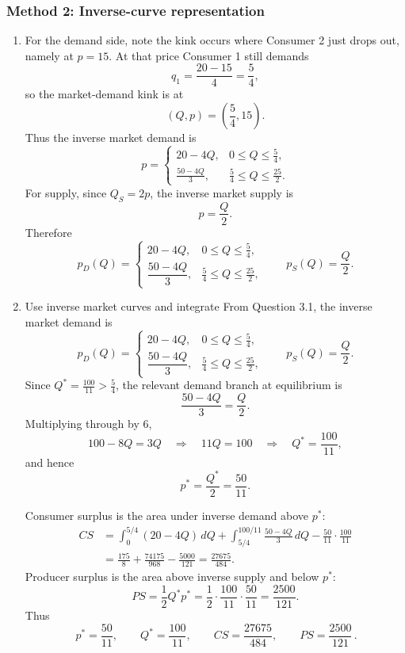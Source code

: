 \documentclass[12pt]{article}
\begin{document}
\subsubsection{Method 2: Inverse-curve representation}
\begin{enumerate}[label=(\alph*)]
    \item For the demand side, note the kink occurs where Consumer 2 just drops out, namely at \(p=15\). At that price Consumer 1 still demands
\[
q_1=\frac{20-15}{4}=\frac{5}{4},
\]
so the market-demand kink is at
\[
\left(Q,p\right)=\left(\frac{5}{4},15\right).
\]
Thus the inverse market demand is
\[
p=
\begin{cases}
20-4Q, & 0\le Q\le \frac{5}{4},\\[0.7em]
\displaystyle \frac{50-4Q}{3}, & \frac{5}{4}\le Q\le \frac{25}{2}.
\end{cases}
\]
For supply, since \(Q_S=2p\), the inverse market supply is
\[
p=\frac{Q}{2}.
\]
Therefore
\[
\boxed{\,
p_D(Q)=
\begin{cases}
20-4Q, & 0\le Q\le \frac{5}{4},\\[0.7em]
\dfrac{50-4Q}{3}, & \frac{5}{4}\le Q\le \frac{25}{2},
\end{cases}
\qquad
p_S(Q)=\frac{Q}{2}.
\,}
\]

    \item Use inverse market curves and integrate
From Question 3.1, the inverse market demand is
\[
p_D(Q)=
\begin{cases}
20-4Q, & 0\le Q\le \frac{5}{4},\\[0.7em]
\dfrac{50-4Q}{3}, & \frac{5}{4}\le Q\le \frac{25}{2},
\end{cases}
\qquad
p_S(Q)=\frac{Q}{2}.
\]
Since \(Q^*=\frac{100}{11}>\frac{5}{4}\), the relevant demand branch at equilibrium is
\[
\frac{50-4Q}{3}=\frac{Q}{2}.
\]
Multiplying through by \(6\),
\[
100-8Q=3Q
\quad\Longrightarrow\quad
11Q=100
\quad\Longrightarrow\quad
Q^*=\frac{100}{11},
\]
and hence
\[
p^*=\frac{Q^*}{2}=\frac{50}{11}.
\]

Consumer surplus is the area under inverse demand above \(p^*\):
\begin{align*}
CS
&=\int_0^{5/4}(20-4Q)\,dQ
+\int_{5/4}^{100/11}\frac{50-4Q}{3}\,dQ
-\frac{50}{11}\cdot \frac{100}{11}\\
&=\frac{175}{8}+\frac{74175}{968}-\frac{5000}{121}
=\frac{27675}{484}.
\end{align*}
Producer surplus is the area above inverse supply and below \(p^*\):
\[
PS=\frac{1}{2}Q^*p^*
=\frac{1}{2}\cdot \frac{100}{11}\cdot \frac{50}{11}
=\frac{2500}{121}.
\]
Thus
\[
\boxed{\,p^*=\frac{50}{11},\qquad Q^*=\frac{100}{11},\qquad CS=\frac{27675}{484},\qquad PS=\frac{2500}{121}\,.}
\]



\end{enumerate}
\end{document}
